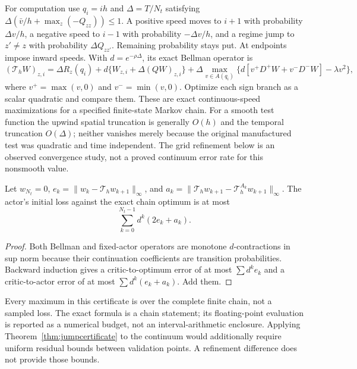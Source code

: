 For computation use $q_i=ih$ and $\Delta=T/N_t$ satisfying
$\Delta(\bar v/h+\max_z(-Q_{zz}))\leq1$. A positive speed moves to $i+1$ with probability $\Delta v/h$, a negative speed to $i-1$ with probability $-\Delta v/h$, and a regime jump to $z'\ne z$ with probability $\Delta Q_{zz'}$. Remaining probability stays put. At endpoints impose inward speeds. With $d=e^{-\rho\Delta}$, its exact Bellman operator is
\begin{equation}\label{eq:chain}
 (\mathcal T_h W)_{z,i}=\Delta R_z(q_i)+d\{W_{z,i}+\Delta(QW)_{z,i}\}
 +\Delta\max_{v\in A(q_i)}
 \{d[v^+D^+W+v^-D^-W]-\lambda v^2\},
\end{equation}
where $v^+=\max(v,0)$ and $v^-=\min(v,0)$. Optimize each sign branch as a scalar quadratic and compare them. These are exact continuous-speed maximizations for a specified finite-state Markov chain. For a smooth test function the upwind spatial truncation is generally $O(h)$ and the temporal truncation $O(\Delta)$; neither vanishes merely because the original manufactured test was quadratic and time independent. The grid refinement below is an observed convergence study, not a proved continuum error rate for this nonsmooth value.

\begin{proposition}\label{prop:chaincertificate}
Let $w_{N_t}=0$, $e_k=\|w_k-\mathcal T_hw_{k+1}\|_\infty$, and
$a_k=\|\mathcal T_hw_{k+1}-\mathcal T_h^{A_k}w_{k+1}\|_\infty$.
The actor's initial loss against the exact chain optimum is at most
\begin{equation}\label{eq:chainbound}
 \sum_{k=0}^{N_t-1} d^k(2e_k+a_k).
\end{equation}
\end{proposition}
\begin{proof}
Both Bellman and fixed-actor operators are monotone $d$-contractions in sup norm because their continuation coefficients are transition probabilities. Backward induction gives a critic-to-optimum error of at most $\sum d^k e_k$ and a critic-to-actor error of at most $\sum d^k(e_k+a_k)$. Add them.\end{proof}
Every maximum in this certificate is over the complete finite chain, not a sampled loss. The exact formula is a chain statement; its floating-point evaluation is reported as a numerical budget, not an interval-arithmetic enclosure. Applying Theorem~\ref{thm:jumpcertificate} to the continuum would additionally require uniform residual bounds between validation points. A refinement difference does not provide those bounds.

